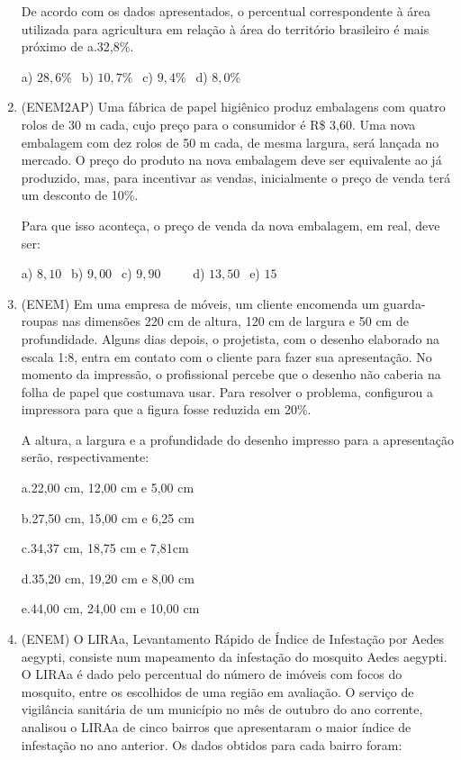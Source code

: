 \begin{multicols*}{2}
\begin{enumerate}
              De acordo com os dados apresentados, o percentual correspondente à área utilizada para agricultura em relação à área do território brasileiro é mais próximo de a.32,8\%.

              a) $28,6\% \ \ $ b) $10,7\% \ \ $ c) $ 9,4\% \ \ $ d) $ 8,0\% $

        \item (ENEM2AP) Uma fábrica de papel higiênico produz embalagens com quatro rolos de 30 m cada, cujo preço
              para o consumidor é R\$ 3,60. Uma nova embalagem com dez rolos de 50 m cada, de mesma largura, será lançada no
              mercado. O preço do produto na nova embalagem deve ser equivalente ao já produzido, mas, para incentivar as
              vendas, inicialmente o preço de venda terá um desconto de 10\%.

              Para que isso aconteça, o preço de venda da nova embalagem, em real, deve ser:

              a) $8,10 \ \ $ b) $9,00 \ \ $ c) $9,90 \ \ \ \ \ \ \ \ \ \ $ d) $13,50 \ \ $ e) $15 \ \ $

        \item (ENEM) Em uma empresa de móveis, um cliente encomenda um guarda-roupas nas dimensões 220 cm de
              altura, 120 cm de largura e 50 cm de profundidade. Alguns dias depois, o projetista, com o desenho elaborado na
              escala 1:8, entra em contato com o cliente para fazer sua apresentação. No momento da impressão, o profissional
              percebe que o desenho não caberia na folha de papel que costumava usar. Para resolver o problema, configurou a
              impressora para que a figura fosse reduzida em 20\%.

              A altura, a largura e a profundidade do desenho impresso para a apresentação serão, respectivamente:

              a.22,00 cm, 12,00 cm e 5,00 cm

              b.27,50 cm, 15,00 cm e 6,25 cm

              c.34,37 cm, 18,75 cm e 7,81cm

              d.35,20 cm, 19,20 cm e 8,00 cm

              e.44,00 cm, 24,00 cm e 10,00 cm

        \item (ENEM) O LIRAa, Levantamento Rápido de Índice de Infestação por Aedes aegypti, consiste num mapeamento da infestação do mosquito Aedes aegypti. O LIRAa é dado pelo percentual do número de imóveis com focos do mosquito, entre os escolhidos de uma região em avaliação. O serviço de vigilância sanitária de um município no mês de outubro do ano corrente, analisou o LIRAa de cinco bairros que apresentaram o maior índice de infestação no ano anterior. Os dados obtidos para cada bairro foram:


\end{enumerate}
\end{multicols*}
